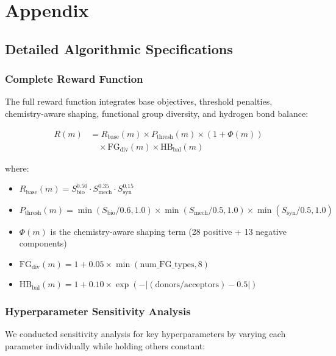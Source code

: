 \documentclass[twocolumn,10pt]{article}
\begin{document}
\appendix
\section{Appendix}

\subsection{Detailed Algorithmic Specifications}

\subsubsection{Complete Reward Function}

The full reward function integrates base objectives, threshold penalties, chemistry-aware shaping, functional group diversity, and hydrogen bond balance:

\begin{equation}
\begin{aligned}
R(m) &= R_\text{base}(m) \times P_\text{thresh}(m) \times (1 + \Phi(m)) \\
&\quad \times \text{FG}_\text{div}(m) \times \text{HB}_\text{bal}(m)
\end{aligned}
\end{equation}

where:
\begin{itemize}[noitemsep,leftmargin=*]
\item $R_\text{base}(m) = S_\text{bio}^{0.50} \cdot S_\text{mech}^{0.35} \cdot S_\text{syn}^{0.15}$
\item $P_\text{thresh}(m) = \min(S_\text{bio}/0.6, 1.0) \times \min(S_\text{mech}/0.5, 1.0) \times \min(S_\text{syn}/0.5, 1.0)$
\item $\Phi(m)$ is the chemistry-aware shaping term (28 positive + 13 negative components)
\item $\text{FG}_\text{div}(m) = 1 + 0.05 \times \min(\text{num\_FG\_types}, 8)$
\item $\text{HB}_\text{bal}(m) = 1 + 0.10 \times \exp(-|(\text{donors}/\text{acceptors}) - 0.5|)$
\end{itemize}

\subsubsection{Hyperparameter Sensitivity Analysis}

We conducted sensitivity analysis for key hyperparameters by varying each parameter individually while holding others constant:
\end{document}
